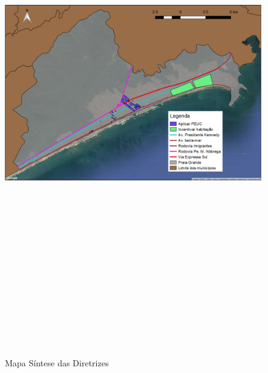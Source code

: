 	\begin{landscape}
		\begin{figure}[h]
			\centering
			\caption{Mapa Síntese das Diretrizes}
			\includegraphics[width=22cm,height=22cm,keepaspectratio]{img/mapa_sintese_diag.png}
			\label{mapa_sintese_diag}
		\end{figure}
	\end{landscape}
    
%
%

	\postextual
	
